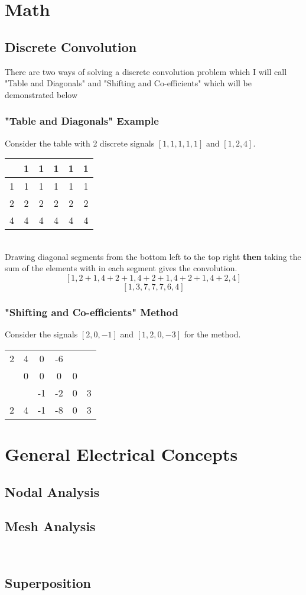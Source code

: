 \documentclass{article}
\begin{document}
\section*{Math}
\subsection*{Discrete Convolution}
There are two ways of solving a discrete convolution problem which I will call "Table and Diagonals" and "Shifting and Co-efficients" which will be demonstrated below
\subsubsection*{"Table and Diagonals" Example}
Consider the table with 2 discrete signals $ [1,1,1,1,1] $ and $ [1,2,4] $.\\
\begin{tabular}{c|ccccc}
	&1&1&1&1&1\\
	\hline
	1&1&1&1&1&1\\
	2&2&2&2&2&2\\
	4&4&4&4&4&4
\end{tabular}\\
Drawing diagonal segments from the bottom left to the top right \textbf{then} taking the sum of the elements with in each segment gives the convolution.
\[ [1, 2+1, 4+2+1, 4+2+1, 4+2+1, 4+2, 4] \]
\[ [1, 3, 7, 7, 7, 6, 4] \]
\subsubsection*{"Shifting and Co-efficients" Method}
Consider the signals $ [2,0,-1] $ and $ [1, 2, 0, -3] $ for the method.\\
\begin{tabular}{cccccc}
	2&4&0&-6&&\\
	&0&0&0&0&\\
	&&-1&-2&0&3\\
	\hline
	2&4&-1&-8&0&3
\end{tabular}
\section*{General Electrical Concepts}
\subsection*{Nodal Analysis}
\subsection*{Mesh Analysis}\
\subsection*{Superposition}
\end{document}
